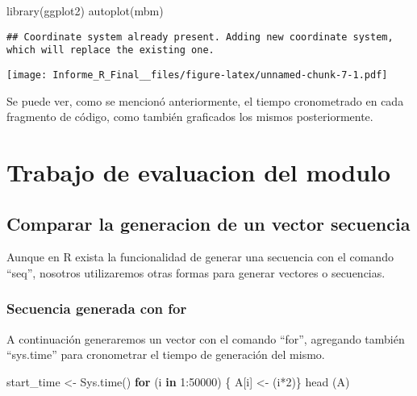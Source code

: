 \documentclass[]{elsarticle} %
\newenvironment{Shaded}{\begin{snugshade}}{\end{snugshade}}
\newcommand{\ControlFlowTok}[1]{\textcolor[rgb]{0.13,0.29,0.53}{\textbf{#1}}}
\newcommand{\DecValTok}[1]{\textcolor[rgb]{0.00,0.00,0.81}{#1}}
\newcommand{\FunctionTok}[1]{\textcolor[rgb]{0.00,0.00,0.00}{#1}}
\newcommand{\NormalTok}[1]{#1}
\newcommand{\OtherTok}[1]{\textcolor[rgb]{0.56,0.35,0.01}{#1}}
\newcommand{\SpecialCharTok}[1]{\textcolor[rgb]{0.00,0.00,0.00}{#1}}
\begin{document}
\begin{Shaded}
\begin{Highlighting}[]
\FunctionTok{library}\NormalTok{(ggplot2)}
\FunctionTok{autoplot}\NormalTok{(mbm)}
\end{Highlighting}
\end{Shaded}

\begin{verbatim}
## Coordinate system already present. Adding new coordinate system, which will replace the existing one.
\end{verbatim}

\texttt{[image: Informe\_R\_Final\_\_files/figure-latex/unnamed-chunk-7-1.pdf]}

Se puede ver, como se mencionó anteriormente, el tiempo cronometrado en
cada fragmento de código, como también graficados los mismos
posteriormente.

\hypertarget{trabajo-de-evaluacion-del-modulo}{%
\section{Trabajo de evaluacion del
modulo}\label{trabajo-de-evaluacion-del-modulo}}

\hypertarget{comparar-la-generacion-de-un-vector-secuencia}{%
\subsection{Comparar la generacion de un vector
secuencia}\label{comparar-la-generacion-de-un-vector-secuencia}}

Aunque en R exista la funcionalidad de generar una secuencia con el
comando ``seq'', nosotros utilizaremos otras formas para generar
vectores o secuencias.

\hypertarget{secuencia-generada-con-for}{%
\subsubsection{Secuencia generada con
for}\label{secuencia-generada-con-for}}

A continuación generaremos un vector con el comando ``for'', agregando
también ``sys.time'' para cronometrar el tiempo de generación del mismo.

\begin{Shaded}
\begin{Highlighting}[]
\NormalTok{start\_time }\OtherTok{\textless{}{-}} \FunctionTok{Sys.time}\NormalTok{()}
\ControlFlowTok{for}\NormalTok{ (i }\ControlFlowTok{in} \DecValTok{1}\SpecialCharTok{:}\DecValTok{50000}\NormalTok{) \{ A[i] }\OtherTok{\textless{}{-}}\NormalTok{ (i}\SpecialCharTok{*}\DecValTok{2}\NormalTok{)\}}
\FunctionTok{head}\NormalTok{ (A)}
\end{Highlighting}
\end{Shaded}
\end{document}
